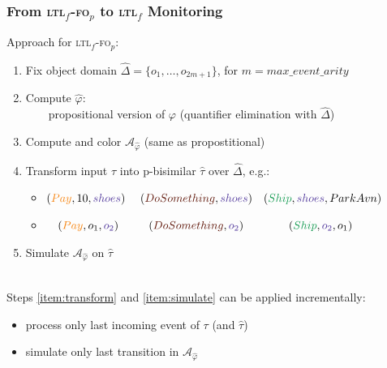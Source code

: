 \documentclass[xcolor=dvipsnames,aspectratio=169]{beamer}
\newcommand{\A}{\mathcal A\xspace}
\newcommand{\ltlf}{\textsc{ltl}$_f$\xspace}
\newcommand{\ltlffop}{\ltlf-\textsc{fo}$_p$\xspace}
\newcommand{\green}[1]{\textcolor{ForestGreen}{#1}}
\newcommand{\orange}[1]{\textcolor{BurntOrange}{#1}}
\newcommand{\violet}[1]{\textcolor{Violet}{#1}}
\newcommand{\sepia}[1]{\textcolor{Sepia}{#1}}
\begin{document}
\begin{frame}
\frametitle{From \ltlffop to \ltlf Monitoring}

Approach for \ltlffop: 
\begin{enumerate}
	\item Fix object domain $\hat\Delta=\{o_1,\ldots,o_{2m+1}\}$, 	for $m=max\_event\_arity$
	\item Compute $\hat\varphi$:\\ 
		~~~~propositional version of $\varphi$ (quantifier elimination with $\hat\Delta$) 
	\item Compute and color $\A_{\hat\varphi}$ (same as propostitional)
	\item\label{item:transform} Transform input $\tau$ into p-bisimilar $\hat\tau$ over $\hat\Delta$, e.g.:
		\begin{itemize}
			\item $(\orange{Pay},10,\violet{shoes})~~~~(\sepia{DoSomething},\violet{shoes})~~~(\green{Ship},\violet{shoes},Park Avn)$
			\item $~~~(\orange{Pay},o_1,\violet{o_2})~~~~~~~~(\sepia{DoSomething},\violet{o_2})~~~~~~~~~~~~(\green{Ship},\violet{o_2},o_1)$
		\end{itemize}	
	\item\label{item:simulate} Simulate $\A_{\hat\varphi}$ on $\hat\tau$
\end{enumerate}

~\\

Steps \ref{item:transform} and \ref{item:simulate} can be applied incrementally:
\begin{itemize}
	\item process only last incoming event of $\tau$ (and $\hat\tau$)
	\item simulate only last transition in $\A_{\hat\varphi}$
\end{itemize}
\end{frame}

\end{document}
